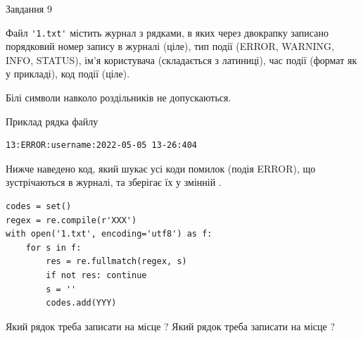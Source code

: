 \documentclass[12pt, ukrainian]{article}
\def\code#1{\Verb!#1!}
\begin{document}
{\begin{minipage}[t]{8.0cm}
\end{minipage}

               
{\begin{center}Завдання {9}\end{center}}
\vspace{-6mm}
Файл \code{'1.txt'} містить журнал з рядками, в яких через двокрапку записано поряд\-ко\-вий номер запису в журналі (ціле), тип події (ERROR, WARNING, INFO, STATUS), ім'я користувача (складається з латиниці), час події (фор\-мат як у прикладі), код події (ціле).

Білі символи навколо роздільників не допускаються.

Приклад рядка файлу



\begin{verbatim}
13:ERROR:username:2022-05-05 13-26:404
\end{verbatim}


Нижче наведено код, який шукає усі коди помилок (подія ERROR), що зустріча\-ють\-ся в журналі, та зберігає їх у змінній .



\begin{verbatim}
codes = set()
regex = re.compile(r'XXX')
with open('1.txt', encoding='utf8') as f:
    for s in f:
        res = re.fullmatch(regex, s)
        if not res: continue
        s = ''
        codes.add(YYY)
\end{verbatim}



Який рядок треба записати на місце  ?
Який рядок треба записати на місце  ?\par

}
\newpage
\end{document}
